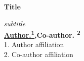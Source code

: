 \documentclass[a0,portrait]{a0poster}
\newcommand\helvetica[1]{\begingroup\sffamily #1\endgroup}
\newcommand\ptitle[2]{\linespread{#1}\selectfont\veryHuge\color{EMBLBlue}\textbf{#2}\par\bigskip}
\begin{document}

\makeatletter
\show\ttlf@section

\helvetica{ 
\begin{minipage}[b]{1.0\linewidth}
\ptitle{1}{Title}  
\color{DarkGrey}
\Huge\textit{subtitle}\\[1.5cm] 
\huge \color{Black} \textbf{\underline{Author.\textsuperscript{1}},Co-author. \textsuperscript{2}} \\[0.5cm]
\normalsize 1. Author affiliation 
\\2. Co-author affiliation
\end{minipage}}

\vspace{1cm} %
\renewcommand\baselinestretch{1}
\end{document}
